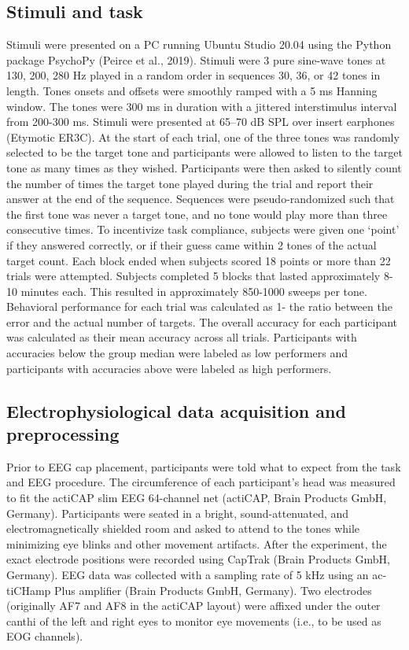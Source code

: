 \documentclass{article}
\begin{document}
\subsection*{Stimuli and task}
					
Stimuli were presented on a PC running Ubuntu Studio 20.04 using the Python package PsychoPy (Peirce et al., 2019). Stimuli were 3 pure sine-wave tones at 130, 200, 280 Hz played in a random order in sequences 30, 36, or 42 tones in length. Tones onsets and offsets were smoothly ramped with a 5 ms Hanning window. The tones were 300 ms in duration with a jittered interstimulus interval from 200-300 ms. Stimuli were presented at 65–70 dB SPL over insert earphones (Etymotic ER3C). At the start of each trial, one of the three tones was randomly selected to be the target tone and participants were allowed to listen to the target tone as many times as they wished. Participants were then asked to silently count the number of times the target tone played during the trial and report their answer at the end of the sequence. Sequences were pseudo-randomized such that the first tone was never a target tone, and no tone would play more than three consecutive times. To incentivize task compliance, subjects were given one ‘point’ if they answered correctly, or if their guess came within 2 tones of the actual target count. Each block ended when subjects scored 18 points or more than 22 trials were attempted. Subjects completed 5 blocks that lasted approximately 8-10 minutes each. This resulted in approximately 850-1000 sweeps per tone. Behavioral performance for each trial was calculated as 1- the ratio between the error and the actual number of targets. The overall accuracy for each participant was calculated as their mean accuracy across all trials. Participants with accuracies below the group median were labeled as low performers and participants with accuracies above were labeled as high performers.
					
\subsection*{Electrophysiological data acquisition and preprocessing}
					
Prior to EEG cap placement, participants were told what to expect from the task and EEG procedure. The circumference of each participant’s head was measured to fit the actiCAP slim EEG 64-channel net (actiCAP, Brain Products GmbH, Germany). Participants were seated in a bright, sound-attenuated, and electromagnetically shielded room and asked to attend to the tones while minimizing eye blinks and other movement artifacts. After the experiment, the exact electrode positions were recorded using CapTrak (Brain Products GmbH, Germany). EEG data was collected with a sampling rate of 5 kHz using an ac- tiCHamp Plus amplifier (Brain Products GmbH, Germany). Two electrodes (originally AF7 and AF8 in the actiCAP layout) were affixed under the outer canthi of the left and right eyes to monitor eye movements (i.e., to be used as EOG channels).		
\end{document}
